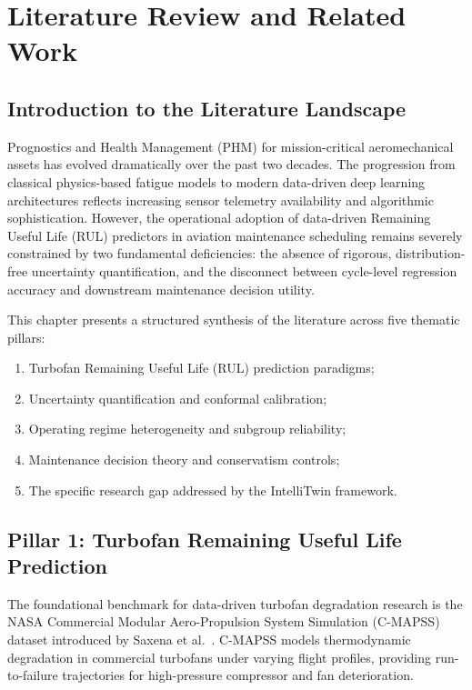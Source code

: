 \chapter{Literature Review and Related Work}
\label{chap:literature_review}

\section{Introduction to the Literature Landscape}
Prognostics and Health Management (PHM) for mission-critical aeromechanical assets has evolved dramatically over the past two decades. The progression from classical physics-based fatigue models to modern data-driven deep learning architectures reflects increasing sensor telemetry availability and algorithmic sophistication. However, the operational adoption of data-driven Remaining Useful Life (RUL) predictors in aviation maintenance scheduling remains severely constrained by two fundamental deficiencies: the absence of rigorous, distribution-free uncertainty quantification, and the disconnect between cycle-level regression accuracy and downstream maintenance decision utility.

This chapter presents a structured synthesis of the literature across five thematic pillars:
\begin{enumerate}
    \item Turbofan Remaining Useful Life (RUL) prediction paradigms;
    \item Uncertainty quantification and conformal calibration;
    \item Operating regime heterogeneity and subgroup reliability;
    \item Maintenance decision theory and conservatism controls;
    \item The specific research gap addressed by the IntelliTwin framework.
\end{enumerate}

\section{Pillar 1: Turbofan Remaining Useful Life Prediction}
The foundational benchmark for data-driven turbofan degradation research is the NASA Commercial Modular Aero-Propulsion System Simulation (C-MAPSS) dataset introduced by Saxena et al.~\cite{saxena2008damage}. C-MAPSS models thermodynamic degradation in commercial turbofans under varying flight profiles, providing run-to-failure trajectories for high-pressure compressor and fan deterioration.

